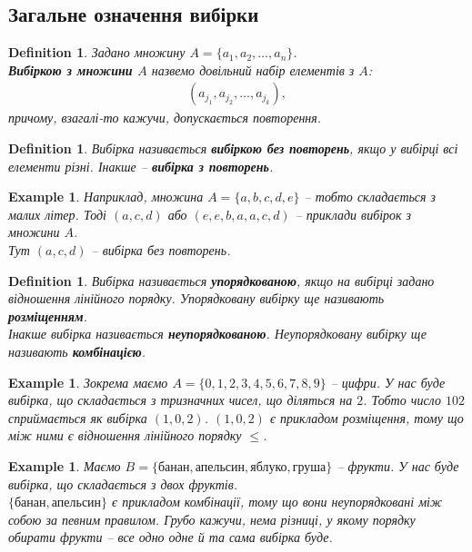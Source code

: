 \documentclass[a4paper, 14pt]{extarticle}
\theoremstyle{theoremdd}
\theoremstyle{theoremdd}
\newtheorem{definition}[theorem]{Definition}
\theoremstyle{theoremdd}
\theoremstyle{theoremdd}
\theoremstyle{theoremdd}
\newtheorem{example}[theorem]{Example}
\theoremstyle{theoremdd}
\theoremstyle{theoremdd}
\theoremstyle{theoremdd}
\theoremstyle{theoremdd}
\theoremstyle{theoremdd}
\theoremstyle{theoremdd}
\theoremstyle{theoremdd}
\theoremstyle{theoremdd}
\theoremstyle{theoremdd}
\theoremstyle{theoremdd}
\begin{document}
\subsection{Загальне означення вибірки}
\begin{definition}
Задано множину $A = \{a_1,a_2,\dots,a_n\}$.\\
\textbf{Вибіркою з множини $A$} назвемо довільний набір елементів з $A$:
\begin{align*}
(a_{j_1},a_{j_2},\dots,a_{j_k}),
\end{align*}
причому, взагалі-то кажучи, допускається повторення.
\end{definition}

\begin{definition}
Вибірка називається \textbf{вибіркою без повторень}, якщо у вибірці всі елементи різні. Інакше -- \textbf{вибірка з повторень}.
\end{definition}

\begin{example}
Наприклад, множина $A = \{a,b,c,d,e\}$ -- тобто складається з малих літер. Тоді $(a,c,d)$ або $(e,e,b,a,a,c,d)$ -- приклади вибірок з множини $A$.\\
Тут $(a,c,d)$ -- вибірка без повторень.
\end{example}

\begin{definition}
Вибірка називається \textbf{упорядкованою}, якщо на вибірці задано відношення лінійного порядку. Упорядковану вибірку ще називають \textbf{розміщенням}.\\
Інакше вибірка називається \textbf{неупорядкованою}. Неупорядковану вибірку ще називають \textbf{комбінацією}.
\end{definition}

\begin{example}
Зокрема маємо $A = \{0,1,2,3,4,5,6,7,8,9\}$ -- цифри. У нас буде вибірка, що складається з тризначних чисел, що діляться на $2$. Тобто число $102$ сприймається як вибірка $(1,0,2)$.
$(1,0,2)$ є прикладом розміщення, тому що між ними є відношення лінійного порядку $\leq$.
\end{example}

\begin{example}
Маємо $B = \{\text{банан},\text{апельсин},\text{яблуко},\text{груша}\}$ -- фрукти. У нас буде вибірка, що складається з двох фруктів.\\
$\{ \text{банан}, \text{апельсин} \}$ є прикладом комбінації, тому що вони неупорядковані між собою за певним правилом. Грубо кажучи, нема різниці, у якому порядку обирати фрукти -- все одно одне й та сама вибірка буде.
\end{example}
\end{document}
